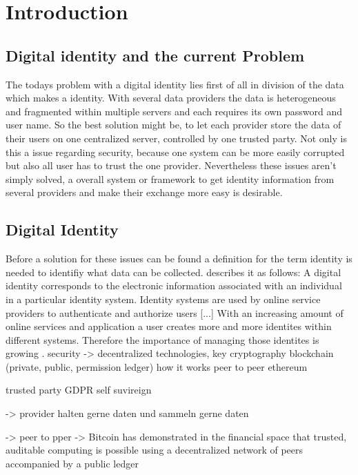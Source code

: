\chapter{Introduction}
\label{cha:introduction}
\section{Digital identity and the current Problem}

The todays problem with a digital identity lies first of all in division of the data which makes a identity. With several data providers the data is heterogeneous and fragmented within multiple servers and each requires its own password and user name. So the best solution might be, to let each provider store the data of their users on one centralized server, controlled by one trusted party. Not only is this a issue regarding security, because one system can be more easily corrupted but also all user has to trust the one provider.
Nevertheless these issues aren't simply solved, a overall system or framework to get identity information from several providers and make their exchange more easy is desirable. 

\section{Digital Identity}
Before a solution for these issues can be found a definition for the term identity is needed to identifiy what data can be collected. \cite{digitalIdentityDefinition} describes it as follows: A digital identity corresponds to the electronic information associated with an individual
in a particular identity system. Identity systems are used by online service providers to authenticate and authorize users [...]
With an increasing amount of online services and application a user creates more and more identites within different systems. Therefore the importance of managing those identites is growing \cite{managingIdentity}.
security -> decentralized technologies, key cryptography
blockchain (private, public, permission ledger)
how it works
peer to peer
ethereum

trusted party
GDPR
self suvireign

-> provider halten gerne daten und sammeln gerne daten

-> peer to pper
-> Bitcoin has demonstrated
in the financial space that trusted, auditable computing is possible
using a decentralized network of peers accompanied by a public
ledger


